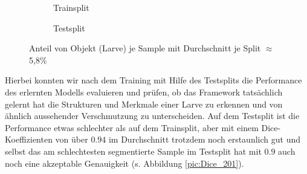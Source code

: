 \begin{figure}[H]
\begin{minipage}{.5\textwidth}
\begin{subfigure}{\textwidth}

\caption{Trainsplit}
\label{pic:Haeuf-Train_201}
\end{subfigure}
\end{minipage}
\begin{minipage}{.5\textwidth}
\begin{subfigure}{\textwidth}

\caption{Testsplit}
\label{pic:Haeuf-Test_201}
\end{subfigure}
\end{minipage}
\caption{Anteil von Objekt (Larve) je Sample mit Durchschnitt je Split $\approx$ 5,8\%}
\label{pic:Haeuf_201}
\end{figure}

Hierbei konnten wir nach dem Training mit Hilfe des Testsplits die Performance des erlernten Modells evaluieren und prüfen, ob das Framework tatsächlich gelernt hat die Strukturen und Merkmale einer Larve zu erkennen und von ähnlich aussehender Verschmutzung zu unterscheiden. Auf dem Testsplit ist die Performance etwas schlechter als auf dem Trainsplit, aber mit einem Dice-Koeffizienten von über $0.94$ im Durchschnitt trotzdem noch erstaunlich gut und selbst das am schlechtesten segmentierte Sample im Testsplit hat mit $0.9$ auch noch eine akzeptable Genauigkeit (s. Abbildung \ref{pic:Dice_201}).


